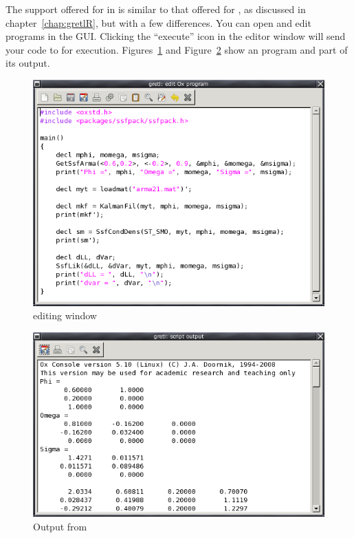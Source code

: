 The support offered for  in  is similar to that
offered for , as discussed in chapter~\ref{chap:gretlR}, but
with a few differences.  You can open and edit  programs in
the  GUI.  Clicking the ``execute'' icon in the editor
window will send your code to  for execution.
Figures~\ref{fig:Oxedit} and Figure~\ref{fig:Oxout} show an 
program and part of its output.

\begin{figure}[htbp]
  \centering
  \includegraphics[scale=0.7]{figures/Oxedit}
  \caption{ editing window}
  \label{fig:Oxedit}
\end{figure}

\begin{figure}[htbp]
  \centering
  \includegraphics[scale=0.7]{figures/Oxout}
  \caption{Output from }
  \label{fig:Oxout}
\end{figure}


